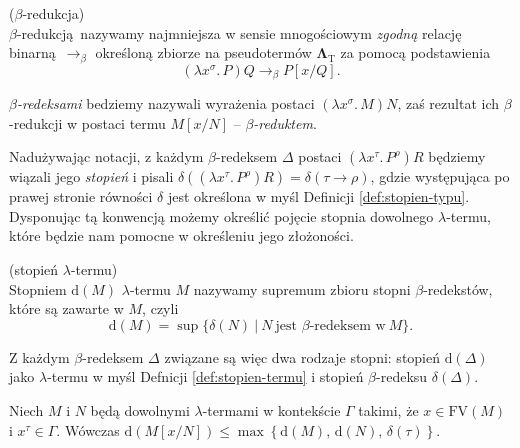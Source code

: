 \begin{definicja}(\(\beta\)-redukcja)\\
  \(\beta\)-redukcją nazywamy najmniejsza w sensie mnogościowym \emph{zgodną} relację binarną \(\longrightarrow_{\beta}\) określoną zbiorze na pseudotermów \(\mathbf{\Lambda}_{\mathrm{T}}\) za pomocą podstawienia
  \[
    (\lambda x^\sigma.\,P)Q \longrightarrow_{\beta} P[x/Q].
  \]
  
  \emph{\(\beta\)-redeksami} bedziemy nazywali wyrażenia postaci \((\lambda x^\sigma.\, M)N\), zaś rezultat ich \(\beta\)-redukcji w postaci termu \(M[x/N]\) -- \emph{\(\beta\)-reduktem}.

  Nadużywając notacji, z każdym \(\beta\)-redeksem \(\Delta\) postaci \((\lambda x^\tau .\,P^\rho)R\) będziemy wiązali jego \emph{stopień} i pisali \(\delta((\lambda x^\tau .\,P^\rho)R)=\delta(\tau\to\rho)\), gdzie występująca po prawej stronie równości \(\delta\) jest określona w myśl Definicji \ref{def:stopien-typu}. Dysponując tą konwencją możemy określić pojęcie stopnia dowolnego \(\lambda\)-termu, które będzie nam pomocne w określeniu jego złożoności.

\begin{definicja}\label{def:stopien-termu}(stopień \(\lambda\)-termu)\\
  Stopniem \(\mathrm{d}(M)\) \(\lambda\)-termu \(M\) nazywamy supremum zbioru stopni \(\beta\)-redekstów, które są zawarte w \(M\), czyli
  \[\mathrm{d}(M)=\sup\{\delta(N) \:|\:N\ \text{jest \(\beta\)-redeksem w}\ M\}.\]
\end{definicja}

\begin{uwaga*}
  Z każdym \(\beta\)-redeksem \(\Delta\) związane są więc dwa rodzaje stopni: stopień \(\mathrm{d}(\Delta)\) jako \(\lambda\)-termu w myśl Defnicji \ref{def:stopien-termu} i stopień \(\beta\)-redeksu \(\delta(\Delta)\).
\end{uwaga*}

\begin{lemat}
  Niech \(M\) i \(N\) będą dowolnymi \(\lambda\)-termami w kontekście \(\Gamma\) takimi, że \(x\in\mathrm{FV}(M)\) i \(x^\tau \in \Gamma\). Wówczas \(\mathrm{d}(M[x/N])\leq \max\left\{\mathrm{d}(M),\, \mathrm{d}(N),\, \delta(\tau)\right\}\).
\end{lemat}
\begin{dowod}

\end{dowod}

\end{definicja}
